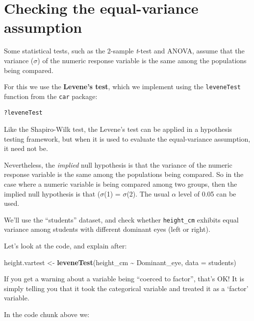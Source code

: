 \documentclass[
]{book}
\newenvironment{Shaded}{\begin{snugshade}}{\end{snugshade}}
\newcommand{\AttributeTok}[1]{\textcolor[rgb]{0.13,0.29,0.53}{#1}}
\newcommand{\FunctionTok}[1]{\textcolor[rgb]{0.13,0.29,0.53}{\textbf{#1}}}
\newcommand{\NormalTok}[1]{#1}
\newcommand{\OtherTok}[1]{\textcolor[rgb]{0.56,0.35,0.01}{#1}}
\newcommand{\SpecialCharTok}[1]{\textcolor[rgb]{0.81,0.36,0.00}{\textbf{#1}}}
\begin{document}
\section{Checking the equal-variance assumption}\label{levenetest}

Some statistical tests, such as the 2-sample \emph{t}-test and ANOVA, assume that the variance (\(\sigma\)) of the numeric response variable is the same among the populations being compared.

For this we use the \textbf{Levene's test}, which we implement using the \texttt{leveneTest} function from the \texttt{car} package:

\begin{verbatim}
?leveneTest
\end{verbatim}

Like the Shapiro-Wilk test, the Levene's test can be applied in a hypothesis testing framework, but when it is used to evaluate the equal-variance assumption, it need not be.

Nevertheless, the \emph{implied} null hypothesis is that the variance of the numeric response variable is the same among the populations being compared. So in the case where a numeric variable is being compared among two groups, then the implied null hypothesis is that (\(\sigma\)(1) = \(\sigma\)(2). The usual \(\alpha\) level of 0.05 can be used.

We'll use the ``students'' dataset, and check whether \texttt{height\_cm} exhibits equal variance among students with different dominant eyes (left or right).

Let's look at the code, and explain after:

\begin{Shaded}
\begin{Highlighting}[]
\NormalTok{height.vartest }\OtherTok{\textless{}{-}} \FunctionTok{leveneTest}\NormalTok{(height\_cm }\SpecialCharTok{\textasciitilde{}}\NormalTok{ Dominant\_eye, }\AttributeTok{data =}\NormalTok{ students)}
\end{Highlighting}
\end{Shaded}

If you get a warning about a variable being ``coerced to factor'', that's OK! It is simply telling you that it took the categorical variable and treated it as a `factor' variable.

In the code chunk above we:
\end{document}

